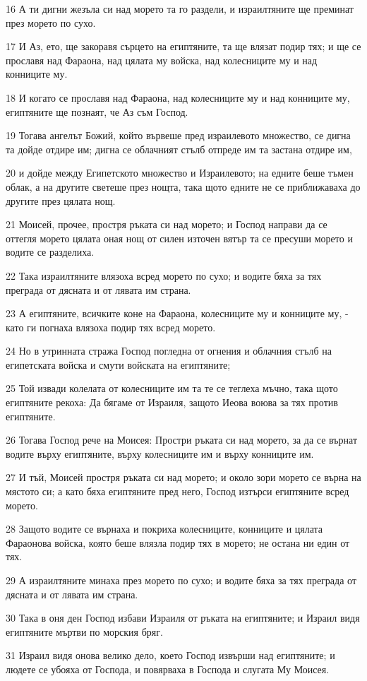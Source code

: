 \par 16 А ти дигни жезъла си над морето та го раздели, и израилтяните ще преминат през морето по сухо.
\par 17 И Аз, ето, ще закоравя сърцето на египтяните, та ще влязат подир тях; и ще се прославя над Фараона, над цялата му войска, над колесниците му и над конниците му.
\par 18 И когато се прославя над Фараона, над колесниците му и над конниците му, египтяните ще познаят, че Аз съм Господ.
\par 19 Тогава ангелът Божий, който вървеше пред израилевото множество, се дигна та дойде отдире им; дигна се облачният стълб отпреде им та застана отдире им,
\par 20 и дойде между Египетското множество и Израилевото; на едните беше тъмен облак, а на другите светеше през нощта, така щото едните не се приближаваха до другите през цялата нощ.
\par 21 Моисей, прочее, простря ръката си над морето; и Господ направи да се оттегля морето цялата оная нощ от силен източен вятър та се пресуши морето и водите се разделиха.
\par 22 Така израилтяните влязоха всред морето по сухо; и водите бяха за тях преграда от дясната и от лявата им страна.
\par 23 А египтяните, всичките коне на Фараона, колесниците му и конниците му, - като ги погнаха влязоха подир тях всред морето.
\par 24 Но в утринната стража Господ погледна от огнения и облачния стълб на египетската войска и смути войската на египтяните;
\par 25 Той извади колелата от колесниците им та те се теглеха мъчно, така щото египтяните рекоха: Да бягаме от Израиля, защото Иеова воюва за тях против египтяните.
\par 26 Тогава Господ рече на Моисея: Простри ръката си над морето, за да се върнат водите върху египтяните, върху колесниците им и върху конниците им.
\par 27 И тъй, Моисей простря ръката си над морето; и около зори морето се върна на мястото си; а като бяха египтяните пред него, Господ изтърси египтяните всред морето.
\par 28 Защото водите се върнаха и покриха колесниците, конниците и цялата Фараонова войска, която беше влязла подир тях в морето; не остана ни един от тях.
\par 29 А израилтяните минаха през морето по сухо; и водите бяха за тях преграда от дясната и от лявата им страна.
\par 30 Така в оня ден Господ избави Израиля от ръката на египтяните; и Израил видя египтяните мъртви по морския бряг.
\par 31 Израил видя онова велико дело, което Господ извърши над египтяните; и людете се убояха от Господа, и повярваха в Господа и слугата Му Моисея.

